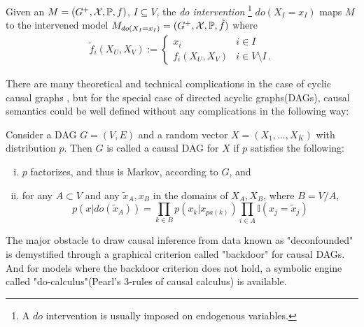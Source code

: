 \begin{Def}[do intervention]
	\label{def:p-intervention}
	Given an \SCM $M=(G^+,\mathcal{X},\mathbb{P}, f)$, $I \subseteq V$, the \emph{do intervention} \footnote{A $do$ intervention is usually imposed on endogenous variables.} $do(X_I=x_I)$ maps $M$ to the intervened model $M_{do(X_I = x_I)} = (G^+,\mathcal{X},\mathbb{P}, \tilde{f})$ where
	$$
	\begin{aligned}
	\tilde f_i(X_U,X_V) := \begin{cases}
	x_i & i \in I \\
	f_i(X_U,X_V) & i \in V \setminus I \,.
	\end{cases}
	\end{aligned}
	$$
\end{Def}


There are many theoretical and technical complications in the case of cyclic causal graphs \cite{Bongers2016}, but for the special case of directed acyclic graphs(DAGs), causal semantics could be well defined without any complications in the following way:

\begin{Def}
	Consider a DAG $G=(V, E)$ and a random vector $X = (X_1, ..., X_K)$ with distribution $p$. Then $G$ is called a causal DAG for $X$ if $p$ satisfies the following:
	\begin{enumerate}[(i)]
		\setlength\itemsep{0em}
		\item $p$ factorizes, and thus is Markov, according to $G$, and
		\item for any $A \subset V$ and any $\tilde{x}_A, x_B$ in the domains of $X_A, X_B$, where $B = V/A$, 
		$$
p(x	| do(\tilde{x}_A)) = \prod_{k \in B} p(x_k|x_{pa(k)})  \prod_{i \in A} \mathbb{I}(x_j = \tilde{x}_j)
		$$
	\end{enumerate}
\end{Def}

 

The major obstacle to draw causal inference from data known as "deconfounded" is demystified through a graphical criterion called "backdoor" for causal DAGs. And for models where the backdoor criterion does not hold, a symbolic engine called "do-calculus"(Pearl's 3-rules of causal calculus)  is available. 


